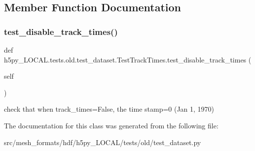 \subsection{Member Function Documentation}
\mbox{\label{classh5py__LOCAL_1_1tests_1_1old_1_1test__dataset_1_1TestTrackTimes_a7efc801cf0dd64526009850942a58fa9}} 
\subsubsection{\texorpdfstring{test\+\_\+disable\+\_\+track\+\_\+times()}{test\_disable\_track\_times()}}
{\footnotesize\ttfamily def h5py\+\_\+\+L\+O\+C\+A\+L.\+tests.\+old.\+test\+\_\+dataset.\+Test\+Track\+Times.\+test\+\_\+disable\+\_\+track\+\_\+times (\begin{DoxyParamCaption}\item[{}]{self }\end{DoxyParamCaption})}

\begin{DoxyVerb}check that when track_times=False, the time stamp=0 (Jan 1, 1970) \end{DoxyVerb}
 

The documentation for this class was generated from the following file\+:\begin{DoxyCompactItemize}
\item 
src/mesh\+\_\+formats/hdf/h5py\+\_\+\+L\+O\+C\+A\+L/tests/old/test\+\_\+dataset.\+py\end{DoxyCompactItemize}
